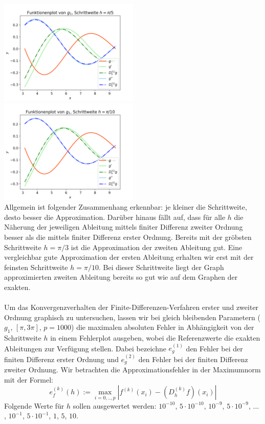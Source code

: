 \documentclass{scrartcl}
\newcommand{\abs}[1]{\left\lvert#1\right\rvert}
\begin{document}
\includegraphics[width=0.5\textwidth]{Grafiken/Funktionenplot_Pi_Funftel} \includegraphics[width=0.5\textwidth]{Grafiken/Funktionenplot_Pi_Zehntel} \\
Allgemein ist folgender Zusammenhang erkennbar: je kleiner die Schrittweite, desto besser die Approximation. Darüber hinaus fällt auf, dass für alle $h$ die Näherung der jeweiligen Ableitung mittels finiter Differenz zweiter Ordnung besser als die mittels finiter Differenz erster Ordnung. Bereits mit der gröbsten Schrittweite $h = \pi/3$ ist die Approximation der zweiten Ableitung gut. Eine vergleichbar gute Approximation der ersten Ableitung erhalten wir erst mit der feinsten Schrittweite $h = \pi/10$. Bei dieser Schrittweite liegt der Graph approximierten zweiten Ableitung bereits so gut wie auf dem Graphen der exakten. \\
 \\
Um das Konvergenzverhalten der Finite-Differenzen-Verfahren erster und zweiter Ordnung graphisch zu untersuchen, lassen wir bei gleich bleibenden Parametern ($g_1$, $[\pi, 3\pi]$, $p = 1000$) die maximalen absoluten Fehler in Abhängigkeit von der Schrittweite $h$ in einem Fehlerplot ausgeben, wobei die Referenzwerte die exakten Ableitungen zur Verfügung stellen. Dabei bezeichne $e_g^{(1)}$ den Fehler bei der finiten Differenz erster Ordnung und $e_g^{(2)}$ den Fehler bei der finiten Differenz zweiter Ordnung. Wir betrachten die Approximationsfehler in der Maximumnorm mit der Formel:
\[e_f^{(k)}(h):=\max_{i=0,..,p}\abs{f^{(k)}(x_i)-(D_h^{(k)}f)(x_i)}\]
Folgende Werte für $h$ sollen ausgewertet werden: $10^{-10}$, $5 \cdot 10^{-10}$, $10^{-9}$, $5 \cdot 10^{-9}$, ... , $10^{-1}$, $5 \cdot 10^{-1}$, $1$, $5$, $10$.
\end{document}
